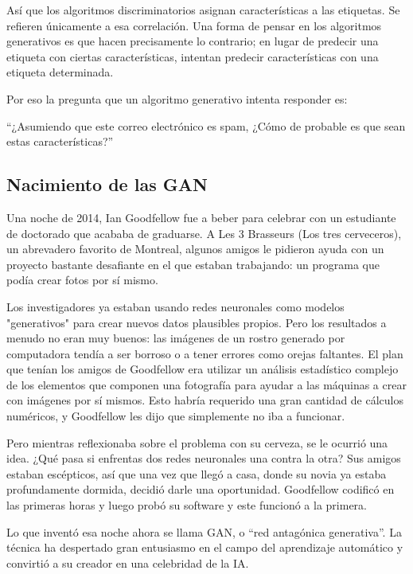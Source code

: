 \documentclass[a4paper]{article}
\begin{document}
Así que los algoritmos discriminatorios asignan características a 
las etiquetas. Se refieren únicamente a esa correlación. Una forma 
de pensar en los algoritmos generativos es que hacen precisamente 
lo contrario; en lugar de predecir una etiqueta con ciertas 
características, intentan predecir características con una 
etiqueta determinada.

Por eso la pregunta que un algoritmo generativo intenta responder 
es:

``¿Asumiendo que este correo electrónico es spam, ¿Cómo de 
probable es que sean estas características?''

\subsection{Nacimiento de las GAN}

Una noche de 2014, Ian Goodfellow fue a beber para celebrar con un 
estudiante de doctorado que acababa de graduarse. A
Les 3 Brasseurs (Los tres cerveceros), un abrevadero favorito de 
Montreal, algunos amigos le pidieron ayuda con un proyecto 
bastante desafiante en el que estaban trabajando: un programa que 
podía crear fotos por sí mismo.

Los investigadores ya estaban usando redes neuronales como
modelos "generativos" para crear nuevos datos plausibles propios. 
Pero los resultados a menudo no eran muy buenos: las imágenes de 
un rostro generado por computadora tendía a ser borroso o a tener 
errores como orejas faltantes. El plan que tenían los amigos de 
Goodfellow era utilizar un análisis estadístico complejo de los 
elementos que componen una fotografía para ayudar a las máquinas a 
crear
con imágenes por sí mismos. Esto habría requerido una gran 
cantidad de cálculos numéricos, y Goodfellow les dijo que
simplemente no iba a funcionar.

Pero mientras reflexionaba sobre el problema con su cerveza, se le 
ocurrió una idea. ¿Qué pasa si enfrentas dos redes neuronales una 
contra la otra? Sus amigos estaban escépticos, así que una vez que 
llegó a casa, donde su novia ya estaba profundamente dormida, 
decidió
darle una oportunidad. Goodfellow codificó en las primeras horas y 
luego probó su software y este funcionó a la primera.

Lo que inventó esa noche ahora se llama GAN, o ``red antagónica 
generativa''. La técnica ha despertado gran
entusiasmo en el campo del aprendizaje automático y convirtió a su 
creador en una celebridad de la IA.
\end{document}
